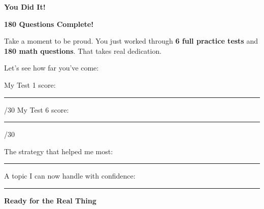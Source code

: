 \clearpage
\thispagestyle{empty}
{\sffamily

\begin{center}
{\fontsize{22}{26}\selectfont\bfseries\color{funPink} \faTrophy\hspace{3mm}You Did It!\hspace{3mm}\faTrophy}

\vspace{2mm}
{\color{funGray}\hrulefill}
\end{center}

\vspace{3mm}

\begin{tcolorbox}[
    enhanced,
    colback=funPinkLight,
    colframe=funPink!50,
    arc=10pt,
    boxrule=1.5pt,
    left=6mm, right=6mm, top=5mm, bottom=5mm,
]
{\large\bfseries\color{funPinkDark} \faAward\hspace{2mm}180 Questions Complete!}

\vspace{2mm}

Take a moment to be proud. You just worked through \textbf{6 full practice tests} and \textbf{180 math questions}. That takes real dedication.

\vspace{3mm}

Let's see how far you've come:

\vspace{2mm}

\faArrowRight\hspace{2mm}My Test 1 score: \rule[-2pt]{1.5cm}{0.5pt}/30 \hfill My Test 6 score: \rule[-2pt]{1.5cm}{0.5pt}/30

\vspace{3mm}

\faArrowRight\hspace{2mm}The strategy that helped me most: \rule[-2pt]{4.5cm}{0.5pt}

\vspace{2mm}

\faArrowRight\hspace{2mm}A topic I can now handle with confidence: \rule[-2pt]{3.5cm}{0.5pt}
\end{tcolorbox}

\vspace{3mm}

\begin{tcolorbox}[
    enhanced,
    colback=funGreenLight,
    colframe=funGreen!50,
    arc=10pt,
    boxrule=1pt,
    left=6mm, right=6mm, top=4mm, bottom=4mm,
]
{\bfseries\color{funGreenDark} \faStar\hspace{2mm}Ready for the Real Thing}


\end{tcolorbox}}
